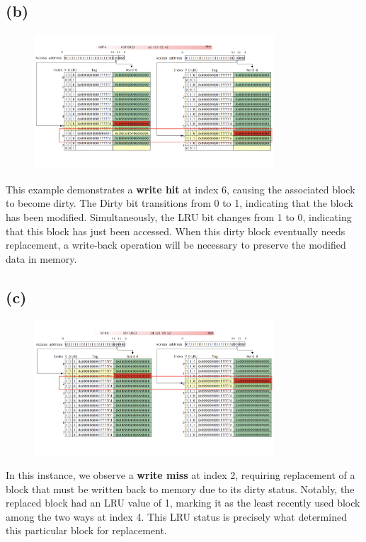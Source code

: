 \documentclass[12pt]{article}
\begin{document}
\subsection*{(b)}

\begin{figure}[h!]
    \centering
    \includegraphics[width=0.8\textwidth]{./img/qb.png}
\end{figure}

This example demonstrates a \textbf{write hit} at index 6, causing the associated block to become dirty. The Dirty bit transitions from 0 to 1, indicating that the block has been modified. Simultaneously, the LRU bit changes from 1 to 0, indicating that this block has just been accessed. When this dirty block eventually needs replacement, a write-back operation will be necessary to preserve the modified data in memory.

\subsection*{(c)}

\begin{figure}[h!]
    \centering
    \includegraphics[width=0.8\textwidth]{./img/qc.png}
\end{figure}

In this instance, we observe a \textbf{write miss} at index 2, requiring replacement of a block that must be written back to memory due to its dirty status. Notably, the replaced block had an LRU value of 1, marking it as the least recently used block among the two ways at index 4. This LRU status is precisely what determined this particular block for replacement.
\end{document}
